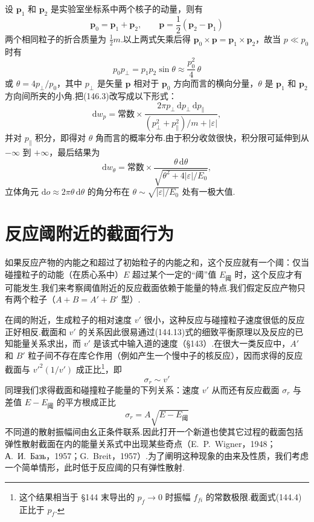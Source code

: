 设 $\boldsymbol{p}_1$ 和 $\boldsymbol{p}_2$ 是实验室坐标系中两个核子的动量，则有
\begin{equation*}
  \boldsymbol{p}_0=\boldsymbol{p}_1+\boldsymbol{p}_2,\qquad
  \boldsymbol{p}=\frac{1}{2}\left(\boldsymbol{p}_2-\boldsymbol{p}_1\right)
\end{equation*}
两个相同粒子的折合质量为 $\frac{1}{2}m$.以上两式矢乘后得 $\boldsymbol{p}_0\times\boldsymbol{p}=\boldsymbol{p}_1\times\boldsymbol{p}_2$，故当 $p\ll p_0$ 时有
\begin{equation*}
  p_0p_{\perp}=p_1p_2\sin\theta\approx\frac{p_0^2}{4}\,\theta
\end{equation*}
或 $\theta=4p_{\perp}/p_0$，其中 $p_{\perp}$ 是矢量 $\boldsymbol{p}$ 相对于 $\boldsymbol{p}_0$ 方向而言的横向分量，$\theta$ 是 $\boldsymbol{p}_1$ 和 $\boldsymbol{p}_2$ 方向间所夹的小角.把(146.3)改写成以下形式：
\begin{equation*}
  \mathrm{d}w_p=\text{常数}\times
  \frac{2\pi p_{\perp}\,\mathrm{d}p_{\perp}\,\mathrm{d}p_{\parallel}}
  {\left(p_{\perp}^2+p_{\parallel}^2\right)/m+|\varepsilon|},
\end{equation*}
并对 $p_{\parallel}$ 积分，即得对 $\theta$ 角而言的概率分布.由于积分收敛很快，积分限可延伸到从 $-\infty$ 到 $+\infty$，最后结果为
\begin{equation}
  \mathrm{d}w_{\theta}=\text{常数}\times
  \frac{\theta\,\mathrm{d}\theta}{\sqrt{\theta^2+4|\varepsilon|/E_0}},
\end{equation}
立体角元 $\mathrm{d}o\approx2\pi\theta\,\mathrm{d}\theta$ 的角分布在 $\theta\sim\sqrt{|\varepsilon|/E_0}$ 处有一极大值.

\section{反应阈附近的截面行为}

如果反应产物的内能之和超过了初始粒子的内能之和，这个反应就有一个阈：仅当碰撞粒子的动能（在质心系中）$E$ 超过某个一定的“阈”值 $E_{\text{阈}}$ 时，这个反应才有可能发生.我们来考察阈值附近的反应截面依赖于能量的特点.我们假定反应产物只有两个粒子（$A+B=A'+B'$ 型）.

在阈的附近，生成粒子的相对速度 $v'$ 很小，这种反应与碰撞粒子速度很低的反应正好相反.截面和 $v'$ 的关系因此很易通过(144.13)式的细致平衡原理以及反应的已知能量关系求出，而 $v'$ 是该式中输入道的速度（§143）.在很大一类反应中，$A'$ 和 $B'$ 粒子间不存在库仑作用（例如产生一个慢中子的核反应），因而求得的反应截面与 $v'^2(1/v')$ 成正比\footnote{这个结果相当于 §144 末导出的 $p_f\to0$ 时振幅 $f_{fi}$ 的常数极限.截面式(144.4)正比于 $p_f$.}，即
\begin{equation}
  \sigma_r\sim v'
\end{equation}
同理我们求得截面和碰撞粒子能量的下列关系：速度 $v'$ 从而还有反应截面 $\sigma_r$ 与差值 $E-E_{\text{阈}}$ 的平方根成正比
\begin{equation}
  \sigma_r=A\sqrt{E-E_{\text{阈}}}
\end{equation}
不同道的散射振幅间由幺正条件联系.因此打开一个新道也使其它过程的截面包括弹性散射截面在内的能量关系式中出现某些奇点（E.~P.~Wigner，1948；А.~И.~Базь，1957；G.~Breit，1957）.为了阐明这种现象的由来及性质，我们考虑一个简单情形，此时低于反应阈的只有弹性散射.

